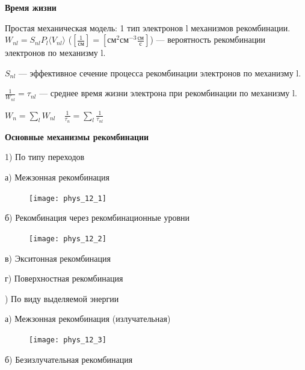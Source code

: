 




\textbf{Время жизни}


Простая механическая модель: 1 тип электронов l механизмов рекомбинации. $W_{nl}=S_{nl}P_l \langle V_{nl} \rangle$ ($\left[ \frac{1}{\text{см}} \right] = \left[ \text{см}^2 \text{см}^{-3} \frac{\text{см}}{\text{с}} \right]$) --- вероятность рекомбинации электронов по механизму l.

$S_{nl}$ --- эффективное сечение процесса рекомбинации электронов по механизму l.

$\frac{1}{W_{nl}}=\tau_{nl}$ --- среднее время жизни электрона при рекомбинации по механизму l.

$W_n=\sum \limits_l W_{nl} \quad \frac{1}{\tau_n} = \sum \limits_l \frac{1}{\tau_{nl}}$ 

\textbf{Основные механизмы рекомбинации}

1) По типу переходов 

а) Межзонная рекомбинация 

\begin{figure}[h!]
    \centering
    \texttt{[image: phys\_12\_1]}
\end{figure}

б) Рекомбинация через рекомбинационные уровни

\begin{figure}[h!]
    \centering
    \texttt{[image: phys\_12\_2]}
\end{figure}

в) Экситонная рекомбинация

г) Поверхностная рекомбинация

) По виду выделяемой энергии

а) Межзонная рекомбинация (излучательная)
\begin{figure}[h!]
    \centering
    \texttt{[image: phys\_12\_3]}
\end{figure}


б) Безизлучательная рекомбинация 

